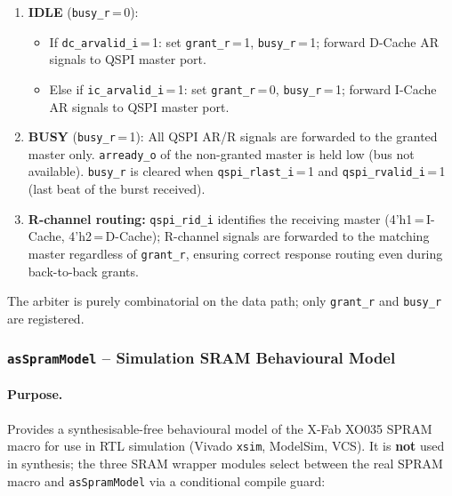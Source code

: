 \begin{enumerate}
  \item \textbf{IDLE} (\texttt{busy\_r}\,=\,0):
    \begin{itemize}
      \item If \texttt{dc\_arvalid\_i}\,=\,1:
        set \texttt{grant\_r}\,=\,1, \texttt{busy\_r}\,=\,1;
        forward D-Cache AR signals to QSPI master port.
      \item Else if \texttt{ic\_arvalid\_i}\,=\,1:
        set \texttt{grant\_r}\,=\,0, \texttt{busy\_r}\,=\,1;
        forward I-Cache AR signals to QSPI master port.
    \end{itemize}

  \item \textbf{BUSY} (\texttt{busy\_r}\,=\,1):
    All QSPI AR/R signals are forwarded to the granted master only.
    \texttt{arready\_o} of the non-granted master is held low (bus
    not available).
    \texttt{busy\_r} is cleared when \texttt{qspi\_rlast\_i}\,=\,1
    and \texttt{qspi\_rvalid\_i}\,=\,1
    (last beat of the burst received).

  \item \textbf{R-channel routing:}
    \texttt{qspi\_rid\_i} identifies the receiving master (4'h1\,=\,I-Cache,
    4'h2\,=\,D-Cache); R-channel signals are forwarded to the
    matching master regardless of \texttt{grant\_r}, ensuring correct
    response routing even during back-to-back grants.
\end{enumerate}

The arbiter is purely combinatorial on the data path; only
\texttt{grant\_r} and \texttt{busy\_r} are registered.

\subsubsection{\texttt{asSpramModel} -- Simulation SRAM Behavioural Model}
\label{subsubsec:asSpramModel}

\paragraph{Purpose.}
Provides a synthesisable-free behavioural model of the X-Fab XO035
SPRAM macro for use in RTL simulation (Vivado \texttt{xsim}, ModelSim,
VCS).
It is \textbf{not} used in synthesis; the three SRAM wrapper modules
select between the real SPRAM macro and \texttt{asSpramModel} via a
conditional compile guard:

